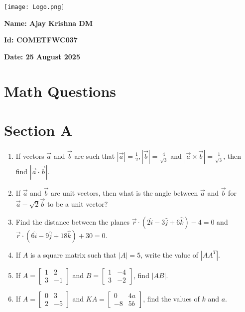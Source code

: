 \documentclass[12pt]{article}
\begin{document}
\begin{minipage}{0.45\textwidth}
\texttt{[image: Logo.png]}
\end{minipage}
\hfill
\begin{minipage}{0.45\textwidth}
\raggedleft 
\textbf{Name: Ajay Krishna DM}\

\textbf{Id: COMETFWC037}\ 

\textbf{Date: 25 August 2025}\
\end{minipage}

\section*{Math Questions}

\section*{Section A}

\begin{enumerate}
\item If vectors $\vec{a}$ and $\vec{b}$ are such that $|\vec{a}|=\tfrac{1}{2}, |\vec{b}|=\tfrac{4}{\sqrt{3}}$ and $|\vec{a}\times \vec{b}|=\tfrac{1}{\sqrt{3}}$, then find $|\vec{a}\cdot \vec{b}|$.

\item If $\vec{a}$ and $\vec{b}$ are unit vectors, then what is the angle between $\vec{a}$ and $\vec{b}$ for $\vec{a}-\sqrt{2}\vec{b}$ to be a unit vector?  

\item Find the distance between the planes $\vec{r}\cdot(2\hat{i}-3\hat{j}+6\hat{k})-4=0$ and $\vec{r}\cdot(6\hat{i}-9\hat{j}+18\hat{k})+30=0$.  

\item If $A$ is a square matrix such that $|A|=5$, write the value of $|AA^T|$.  

\item If $A=\begin{bmatrix}1 & 2 \\ 3 & -1\end{bmatrix}$ and $B=\begin{bmatrix}1 & -4 \\ 3 & -2\end{bmatrix}$, find $|AB|$.  

\item If $A=\begin{bmatrix}0 & 3 \\ 2 & -5\end{bmatrix}$ and $KA=\begin{bmatrix}0 & 4a \\ -8 & 5b\end{bmatrix}$, find the values of $k$ and $a$.

\end{enumerate}
\end{document}
